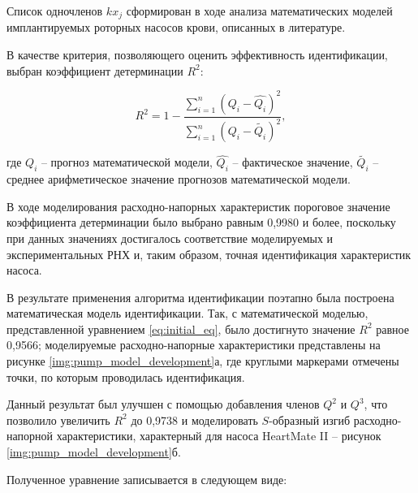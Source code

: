 Список одночленов $kx_j$ сформирован в ходе анализа математических моделей имплантируемых роторных насосов крови, описанных в литературе. 

В качестве критерия, позволяющего оценить эффективность идентификации, выбран коэффициент детерминации $R^2$:

\begin{equation}
	\label{eq:r_squared}
		R^2 = 1- \frac{{\sum\limits_{i=1}^n} (Q_i - \hat{Q_i})^2}{{\sum\limits_{i=1}^n} (Q_i - \tilde{Q_i})^2}, %
\end{equation}

\noindent где $Q_i$ -- прогноз математической модели, $\hat{Q_i}$ -- фактическое значение, $\tilde{Q_i}$ -- среднее арифметическое значение прогнозов математической модели. 

В ходе моделирования расходно-напорных характеристик пороговое значение коэффициента детерминации было выбрано равным 0,9980 и более, поскольку при данных значениях достигалось соответствие моделируемых и экспериментальных РНХ и, таким образом, точная идентификация характеристик насоса.




В результате применения алгоритма идентификации поэтапно была построена математическая модель идентификации. Так, с математической моделью, представленной уравнением \eqref{eq:initial_eq}, было достигнуто значение $R^2$ равное 0,9566; моделируемые расходно-напорные характеристики представлены на рисунке \ref{img:pump_model_development}а, где круглыми маркерами отмечены точки, по которым проводилась идентификация. 

Данный результат был улучшен с помощью добавления членов $Q^2$ и $Q^3$, что позволило увеличить $R^2$ до 0,9738 и моделировать $S$-образный изгиб расходно-напорной характеристики, характерный для насоса HeartMate II -- рисунок \ref{img:pump_model_development}б. 

Полученное уравнение записывается в следующем виде: 


